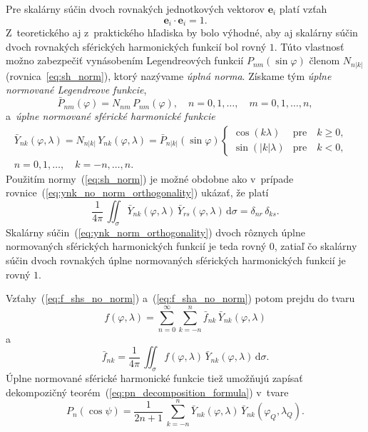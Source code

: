\documentclass[a4paper,12pt]{book}
\newcommand{\diff}{\mathrm d}
\let\vec\mathbf
\begin{document}
Pre skalárny súčin dvoch rovnakých jednotkových vektorov $\vec e_i$ platí vzťah
%
\begin{equation}
\vec e_i \cdot \vec e_i = 1{.}
\end{equation}
%
Z~teoretického aj z~praktického hľadiska by bolo výhodné, aby aj skalárny súčin
dvoch rovnakých sférických harmonických funkcií bol rovný $1$.  Túto vlastnosť
možno zabezpečiť vynásobením Legendreových funkcií $P_{nm}(\sin\varphi)$ členom
$N_{n|k|}$ (rovnica~\ref{eq:sh_norm}), ktorý nazývame \emph{úplná norma}.  
Získame tým \emph{úplne normované Legendreove funkcie},
%
\begin{equation}
\bar{P}_{nm}(\varphi) = N_{nm} \, P_{nm}(\varphi){,} \quad  n = 0, 1, \dots,
\quad m = 0, 1, \dots, n{,}
\end{equation}
%
a~\emph{úplne normované sférické harmonické funkcie}
%
\begin{equation}
\label{eq:ynk_norm}
\begin{split}
\bar{Y}_{nk}(\varphi, \lambda) = N_{n|k|} \, Y_{nk}(\varphi, \lambda)
= \bar{P}_{n|k|}(\sin\varphi)
%
\begin{cases}
\cos(k\lambda)    &\text{pre} \quad k \geq 0{,}\\
\sin(|k|\lambda)  &\text{pre} \quad k < 0{,}
\end{cases}
&
%
\\
n = 0, 1, \dots, \quad k = -n, \dots, n{.}&
\end{split}
\end{equation}
%
Použitím normy~(\ref{eq:sh_norm}) je možné obdobne ako v~prípade
rovnice~(\ref{eq:ynk_no_norm_orthogonality}) ukázať, že platí
%
\begin{equation}
\label{eq:ynk_norm_orthogonality}
\frac{1}{4\pi} \, \iint_{\sigma} \bar{Y}_{nk}(\varphi, \lambda) \,
\bar{Y}_{rs}(\varphi, \lambda) \, \diff \sigma = \delta_{nr} \, \delta_{ks}{.}
\end{equation}
%
Skalárny súčin~(\ref{eq:ynk_norm_orthogonality}) dvoch rôznych úplne
normovaných sférických harmonických funkcií je teda rovný 0, zatiaľ čo skalárny
súčin dvoch rovnakých úplne normovaných sférických harmonických funkcií je
rovný $1$.

Vzťahy~(\ref{eq:f_shs_no_norm}) a~(\ref{eq:f_sha_no_norm}) potom prejdu do
tvaru
%
\begin{equation}
\label{eq:f_shs}
f(\varphi, \lambda) = \sum_{n = 0}^\infty \sum_{k = -n}^n \bar{f}_{nk} \,
\bar{Y}_{nk}(\varphi, \lambda)
\end{equation}
%
a
%
\begin{equation}
\label{eq:f_sha}
\bar{f}_{nk} = \frac{1}{4\pi} \, \iint_{\sigma} f(\varphi, \lambda) \,
\bar{Y}_{nk}(\varphi, \lambda) \, \diff \sigma{.}
\end{equation}
%
Úplne normované sférické harmonické funkcie tiež umožňujú zapísať dekompozičný
teorém~(\ref{eq:pn_decomposition_formula}) v~tvare
\parencite{MoritzPhysicalGeodesy}
%
\begin{equation}
P_n(\cos\psi) = \frac{1}{2n + 1} \, \sum_{k = -n}^n \bar{Y}_{nk}(\varphi,
\lambda) \, \bar{Y}_{nk}(\varphi_Q, \lambda_Q){.}
\end{equation}
\end{document}
